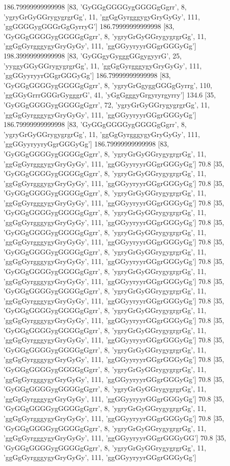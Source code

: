 186.79999999999998 [83, 'GyGGgGGGGygGGGGgGgrr', 8, 'ygryGrGyGGrygygrgrGg', 11, 'ggGgGyrgggygyGryGyGy', 111, 'ggGGGGygGGGrGgGyrryG']
186.79999999999998 [83, 'GyGGgGGGGygGGGGgGgrr', 8, 'ygryGrGyGGrygygrgrGg', 11, 'ggGgGyrgggygyGryGyGy', 111, 'ggGGyyryyrGGgrGGGyGg']
198.39999999999998 [83, 'GyGGgyGygggGGgygyyrG', 25, 'yyggyGGyGGrygygrgrGg', 11, 'ggGgGyrgggygyGryGyGy', 111, 'ggGGyyryyrGGgrGGGyGg']
186.79999999999998 [83, 'GyGGgGGGGygGGGGgGgrr', 8, 'ygryGrGgyggGGGgGyrrg', 110, 'ggGGyGrrrGGGrGygggrG', 41, 'yGgGgggyGrgyryrgyrry']
134.6 [35, 'GyGGgGGGGygGGGGgGgrr', 72, 'ygryGrGyGGrygygrgrGg', 11, 'ggGgGyrgggygyGryGyGy', 111, 'ggGGyyryyrGGgrGGGyGg']
186.79999999999998 [83, 'GyGGgGGGGygGGGGgGgrr', 8, 'ygryGrGyGGrygygrgrGg', 11, 'ggGgGyrgggygyGryGyGy', 111, 'ggGGyyryyryGgrGGGyGg']
186.79999999999998 [83, 'GyGGgGGGGygGGGGgGgrr', 8, 'ygryGrGyGGrygygrgrGg', 11, 'ggGgGyrgggygyGryGyGy', 111, 'ggGGyyryyrGGgrGGGyGg']
70.8 [35, 'GyGGgGGGGygGGGGgGgrr', 8, 'ygryGrGyGGrygygrgrGg', 11, 'ggGgGyrgggygyGryGyGy', 111, 'ggGGyyryyrGGgrGGGyGg']
70.8 [35, 'GyGGgGGGGygGGGGgGgrr', 8, 'ygryGrGyGGrygygrgrGg', 11, 'ggGgGyrgggygyGryGyGy', 111, 'ggGGyyryyrGGgrGGGyGg']
70.8 [35, 'GyGGgGGGGygGGGGgGgrr', 8, 'ygryGrGyGGrygygrgrGg', 11, 'ggGgGyrgggygyGryGyGy', 111, 'ggGGyyryyrGGgrGGGyGg']
70.8 [35, 'GyGGgGGGGygGGGGgGgrr', 8, 'ygryGrGyGGrygygrgrGg', 11, 'ggGgGyrgggygyGryGyGy', 111, 'ggGGyyryyrGGgrGGGyGg']
70.8 [35, 'GyGGgGGGGygGGGGgGgrr', 8, 'ygryGrGyGGrygygrgrGg', 11, 'ggGgGyrgggygyGryGyGy', 111, 'ggGGyyryyrGGgrGGGyGg']
70.8 [35, 'GyGGgGGGGygGGGGgGgrr', 8, 'ygryGrGyGGrygygrgrGg', 11, 'ggGgGyrgggygyGryGyGy', 111, 'ggGGyyryyrGGgrGGGyGg']
70.8 [35, 'GyGGgGGGGygGGGGgGgrr', 8, 'ygryGrGyGGrygygrgrGg', 11, 'ggGgGyrgggygyGryGyGy', 111, 'ggGGyyryyrGGgrGGGyGg']
70.8 [35, 'GyGGgGGGGygGGGGgGgrr', 8, 'ygryGrGyGGrygygrgrGg', 11, 'ggGgGyrgggygyGryGyGy', 111, 'ggGGyyryyrGGgrGGGyGg']
70.8 [35, 'GyGGgGGGGygGGGGgGgrr', 8, 'ygryGrGyGGrygygrgrGg', 11, 'ggGgGyrgggygyGryGyGy', 111, 'ggGGyyryyrGGgrGGGyGg']
70.8 [35, 'GyGGgGGGGygGGGGgGgrr', 8, 'ygryGrGyGGrygygrgrGg', 11, 'ggGgGyrgggygyGryGyGy', 111, 'ggGGyyryyrGGgrGGGyGg']
70.8 [35, 'GyGGgGGGGygGGGGgGgrr', 8, 'ygryGrGyGGrygygrgrGg', 11, 'ggGgGyrgggygyGryGyGy', 111, 'ggGGyyryyrGGgrGGGyGg']
70.8 [35, 'GyGGgGGGGygGGGGgGgrr', 8, 'ygryGrGyGGrygygrgrGg', 11, 'ggGgGyrgggygyGryGyGy', 111, 'ggGGyyryyrGGgrGGGyGg']
70.8 [35, 'GyGGgGGGGygGGGGgGgrr', 8, 'ygryGrGyGGrygygrgrGg', 11, 'ggGgGyrgggygyGryGyGy', 111, 'ggGGyyryyrGGgrGGGyGg']
70.8 [35, 'GyGGgGGGGygGGGGgGgrr', 8, 'ygryGrGyGGrygygrgrGg', 11, 'ggGgGyrgggygyGryGyGy', 111, 'ggGGyyryyrGGgrGGGyGG']
70.8 [35, 'GyGGgGGGGygGGGGgGgrr', 8, 'ygryGrGyGGrygygrgrGg', 11, 'ggGgGyrgggygyGryGyGy', 111, 'ggGGyyryyrGGgrGGGyGg']
